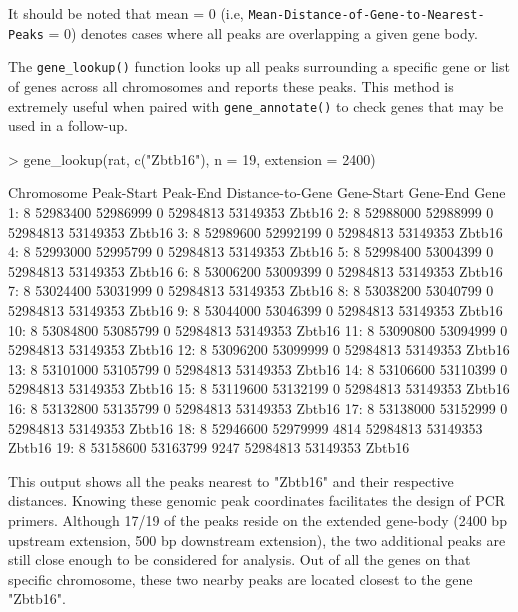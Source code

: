 \documentclass[12pt]{article}
\begin{document}
It should be noted that mean = 0 (i.e, \texttt{Mean-Distance-of-Gene-to-Nearest-Peaks} = 0) denotes cases where all peaks are overlapping a given gene body.  

The \texttt{gene\_lookup()} function looks up all peaks surrounding a specific gene or list of genes across all chromosomes and reports these peaks. This method is extremely useful when paired with \texttt{gene\_annotate()} to check genes that may be used in a follow-up.

\begin{Schunk}
\begin{Sinput}
> gene_lookup(rat, c("Zbtb16"), n = 19, extension = 2400)
\end{Sinput}
\begin{Soutput}
    Chromosome Peak-Start Peak-End Distance-to-Gene Gene-Start Gene-End   Gene
 1:          8   52983400 52986999                0   52984813 53149353 Zbtb16
 2:          8   52988000 52988999                0   52984813 53149353 Zbtb16
 3:          8   52989600 52992199                0   52984813 53149353 Zbtb16
 4:          8   52993000 52995799                0   52984813 53149353 Zbtb16
 5:          8   52998400 53004399                0   52984813 53149353 Zbtb16
 6:          8   53006200 53009399                0   52984813 53149353 Zbtb16
 7:          8   53024400 53031999                0   52984813 53149353 Zbtb16
 8:          8   53038200 53040799                0   52984813 53149353 Zbtb16
 9:          8   53044000 53046399                0   52984813 53149353 Zbtb16
10:          8   53084800 53085799                0   52984813 53149353 Zbtb16
11:          8   53090800 53094999                0   52984813 53149353 Zbtb16
12:          8   53096200 53099999                0   52984813 53149353 Zbtb16
13:          8   53101000 53105799                0   52984813 53149353 Zbtb16
14:          8   53106600 53110399                0   52984813 53149353 Zbtb16
15:          8   53119600 53132199                0   52984813 53149353 Zbtb16
16:          8   53132800 53135799                0   52984813 53149353 Zbtb16
17:          8   53138000 53152999                0   52984813 53149353 Zbtb16
18:          8   52946600 52979999             4814   52984813 53149353 Zbtb16
19:          8   53158600 53163799             9247   52984813 53149353 Zbtb16
\end{Soutput}
\end{Schunk}

This output shows all the peaks nearest to "Zbtb16" and their respective distances.  Knowing these genomic peak coordinates facilitates the design of PCR primers.  Although 17/19 of the peaks reside on the extended gene-body (2400 bp upstream extension, 500 bp downstream extension), the two additional peaks are still close enough to be considered for analysis.  Out of all the genes on that specific chromosome, these two nearby peaks are located closest to the gene "Zbtb16".
\end{document}
